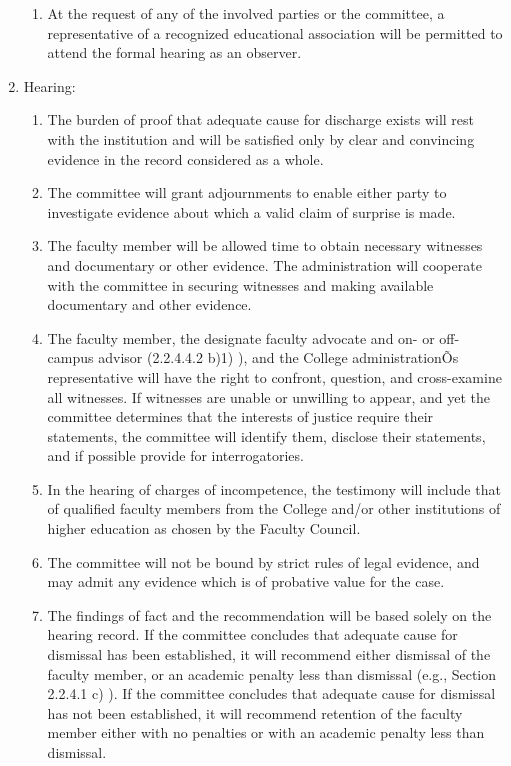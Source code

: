 \documentclass[letterpaper, 11pt]{article}
\begin{document}
\begin{enumerate}[label=\alph*)]
{\begin{enumerate}[label=\arabic*)]
							\item{At the request of any of the involved parties or the committee, a representative of a recognized educational association will be permitted to attend the formal hearing as an observer.}
						\end{enumerate}
					}
					\item{Hearing:
						\begin{enumerate}[label=\arabic*)]
							\item{The burden of proof that adequate cause for discharge exists will rest with the institution and will be satisfied only by clear and convincing evidence in the record considered as a whole.}
							\item{The committee will grant adjournments to enable either party to investigate evidence about which a valid claim of surprise is made.}
							\item{The faculty member will be allowed time to obtain necessary witnesses and documentary or other evidence.  The administration will cooperate with the committee in securing witnesses and making available documentary and other evidence.}
							\item{The faculty member, the designate faculty advocate and on- or off-campus advisor (2.2.4.4.2  b)1) ), and the College administrationÕs representative will have the right to confront, question, and cross-examine all witnesses.  If witnesses are unable or unwilling to appear, and yet the committee determines that the interests of justice require their statements, the committee will identify them, disclose their statements, and if possible provide for interrogatories.}
							\item{In the hearing of charges of incompetence, the testimony will include that of qualified faculty members from the College and/or other institutions of higher education as chosen by the Faculty Council.}
							\item{The committee will not be bound by strict rules of legal evidence, and may admit any evidence which is of probative value for the case.}
							\item{The findings of fact and the recommendation will be based solely on the hearing record.
								If the committee concludes that adequate cause for dismissal has been established, it will recommend either dismissal of the faculty member, or an academic penalty less than dismissal (e.g., Section 2.2.4.1 c) ).  If the committee concludes that adequate cause for dismissal has not been established, it will recommend retention of the faculty member either with no penalties or with an academic penalty less than dismissal.}

\end{enumerate}}
\end{enumerate}
\end{document}
